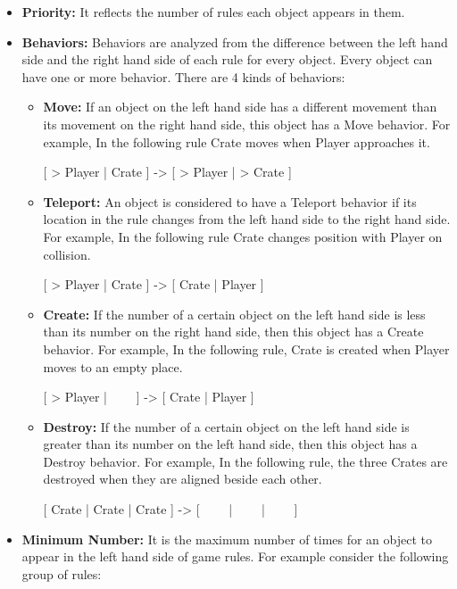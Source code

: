 \begin{itemize}
	\item \textbf{Priority:} It reflects the number of rules each object appears in them.
	\item \textbf{Behaviors:} Behaviors are analyzed from the difference between the left hand side and the right hand side of each rule for every object. Every object can have one or more behavior. There are 4 kinds of behaviors:
		\begin{itemize} \itemsep0pt \parskip0pt 
			\item \textbf{Move:} If an object on the left hand side has a different movement than its movement on the right hand side, this object has a Move behavior. For example, In the following rule Crate moves when Player approaches it.
			\begin{center}
				[ > Player | Crate ] -> [ > Player | > Crate ]
			\end{center}
			\item \textbf{Teleport:} An object is considered to have a Teleport behavior if its location in the rule changes from the left hand side to the right hand side. For example, In the following rule Crate changes position with Player on collision.
			\begin{center}
				[ > Player | Crate ] -> [ Crate | Player ]
			\end{center}
			\item \textbf{Create:} If the number of a certain object on the left hand side is less than its number on the right hand side, then this object has a Create behavior. For example, In the following rule, Crate is created when Player moves to an empty place.
			\begin{center}
				[ > Player | \ \ \ \ ] -> [ Crate | Player ]
			\end{center}
			\item \textbf{Destroy:} If the number of a certain object on the left hand side is greater than its number on the left hand side, then this object has a Destroy behavior. For example, In the following rule, the three Crates are destroyed when they are aligned beside each other.
			\begin{center}
				[ Crate | Crate | Crate ] -> [ \ \ \ \ | \ \ \ \ | \ \ \ \ ]
			\end{center}
		\end{itemize}
	\item \textbf{Minimum Number:} It is the maximum number of times for an object to appear in the left hand side of game rules. For example consider the following group of rules:

\end{itemize}
